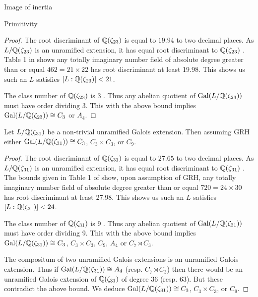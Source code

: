 \documentclass[11pt,a4paper]{article}
\begin{document}
\begin{section}{Image of inertia}
\begin{subsection}{Primitivity}
\begin{proof}
The root discriminant of $\mathbb{Q}(\zeta_{23})$ is equal to $19.94$ to two decimal places.
As $L/\mathbb{Q}(\zeta_{23})$ is an unramified extension, it has equal root discriminant to $\mathbb{Q}(\zeta_{23})$ \cite[Lemma 11.22]{washington}.
 Table 1 in \cite{DiazyDiazTables} shows any totally imaginary number field of absolute degree greater than or equal $462 = 21\times 22$ has root discriminant at least 19.98.
 This shows us such an $L$ satisfies $[L:\mathbb{Q}(\zeta_{23})] < 21$.

The class number of $\mathbb{Q}(\zeta_{23})$ is 3 \cite[Tables, \S 3]{washington}. Thus any abelian quotient of $\Gal(L/\QQ(\zeta_{23}))$ must have order dividing 3.
This with the above bound implies $\Gal(L/\QQ(\zeta_{23})) \cong C_3$ or $A_4$.
\end{proof}


\begin{lemma}
\label{lemma_primitivity_unramified_extns_of_31}
Let $L/\mathbb{Q}(\zeta_{31})$ be a non-trivial unramified Galois extension. Then assuming GRH either $\Gal(L/\QQ(\zeta_{31})) \cong C_3$, $C_3 \times C_3$, or $C_9$.
\end{lemma}

\begin{proof}
The root discriminant of $\mathbb{Q}(\zeta_{31})$ is equal to $27.65$ to two decimal places.
As $L/\mathbb{Q}(\zeta_{31})$ is an unramified extension, it has equal root discriminant to $\mathbb{Q}(\zeta_{31})$ \cite[Lemma 11.22]{washington}.
 The bounds given in Table 1 of \cite{Odlyzko_bounds} show, upon assumption of GRH, any totally imaginary number field of absolute degree greater than or equal $720 = 24\times 30$ has root discriminant at least 27.98.
 This shows us such an $L$ satisfies $[L:\mathbb{Q}(\zeta_{31})] < 24$.

The class number of $\mathbb{Q}(\zeta_{31})$ is 9 \cite[Tables, \S 3]{washington}. Thus any abelian quotient of $\Gal(L/\QQ(\zeta_{31}))$ must have order dividing 9.
This with the above bound implies $\Gal(L/\QQ(\zeta_{31})) \cong C_3$, $C_3\times C_3$, $C_9$, $A_4$ or $C_7 \rtimes C_3$.

The compositum of two unramified Galois extensions is an unramified Galois extension.
Thus if $\Gal(L/\QQ(\zeta_{31})) \cong A_4$ (resp. $C_7 \rtimes C_3$) then there would be an unramified Galois extension of $\mathbb{Q}(\zeta_{31})$ of degree $36$ (resp. $63$). But these contradict the above bound.
We deduce $\Gal(L/\QQ(\zeta_{31})) \cong C_3$, $C_3\times C_3$, or $C_9$.
\end{proof}



\end{subsection}
\end{section}
\end{document}

